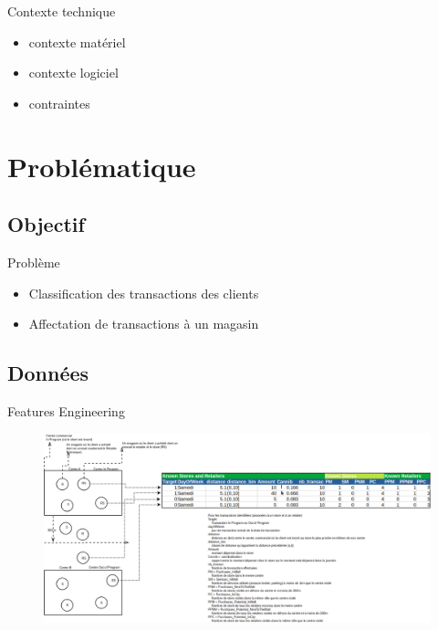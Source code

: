 \documentclass[xelatex,12pt]{beamer}
\begin{document}
\begin{frame}{Contexte technique}
  \begin{itemize}
  \item contexte matériel
  \item contexte logiciel
  \item contraintes
  \end{itemize}
\end{frame}

\section{Problématique}

\subsection{Objectif}

\begin{frame}{Problème}
  \begin{itemize}
  \item Classification des transactions des clients
  \item Affectation de transactions à un magasin
  \end{itemize}
\end{frame}

\subsection{Données}
\begin{frame}{Features Engineering }
\begin{figure}[H]
    \includegraphics[width=11.5cm,height=5.5cm]{images/feature_engineering.png}
    \label{fig:L1}
\end{figure}
\end{frame}
\end{document}
